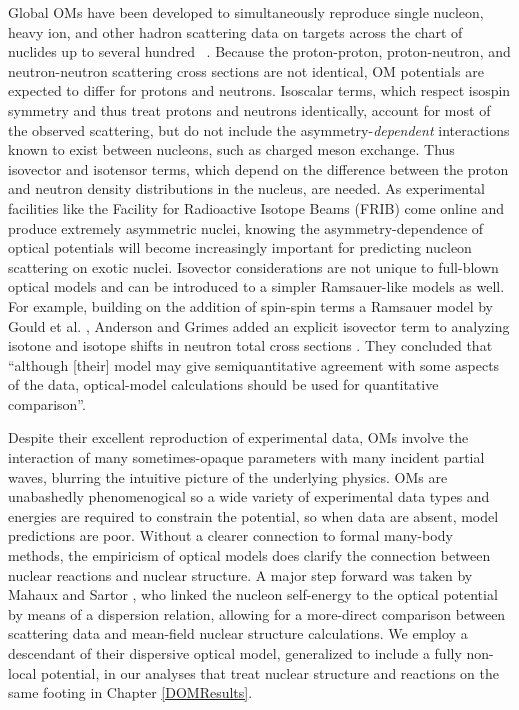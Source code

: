 Global OMs have been developed to simultaneously reproduce single nucleon, heavy ion,
and other hadron scattering data on targets across the chart of nuclides up to several
hundred \mega\electronvolt\ \cite{CH89, KoningDelaroche}. Because the proton-proton,
proton-neutron, and neutron-neutron scattering cross sections
are not identical, OM potentials are expected to differ for protons and
neutrons. Isoscalar terms, which respect isospin symmetry and thus treat protons and neutrons 
identically, account for most of the observed scattering, but do not include
the asymmetry-\textit{dependent} interactions known to exist between
nucleons, such as charged meson exchange.
Thus isovector and isotensor terms,
which depend on the difference between the proton and neutron density
distributions in the nucleus, are needed. As experimental facilities like
the Facility for Radioactive Isotope Beams (FRIB) come online and produce
extremely asymmetric nuclei, knowing the asymmetry-dependence of optical
potentials will become increasingly important for predicting nucleon scattering on
exotic nuclei. Isovector considerations are not unique to full-blown optical
models and can be introduced to a simpler Ramsauer-like models as well. For example, building
on the addition of spin-spin terms a Ramsauer model by Gould et al. \cite{Gould1986},
Anderson and Grimes added an explicit isovector term to analyzing isotone and isotope shifts in 
neutron total cross sections \cite{Anderson1990}.
They concluded that ``although [their] model may give
semiquantitative agreement with some aspects of the data, optical-model
calculations should be used for quantitative comparison''.

Despite their excellent reproduction of experimental data,
OMs involve the interaction of
many sometimes-opaque parameters with many incident
partial waves, blurring the intuitive picture of the underlying physics.
OMs are unabashedly phenomenogical so a wide variety of
experimental data types and energies are required to constrain the potential,
so when data are absent, model predictions are poor. Without a clearer connection to formal
many-body methods, the empiricism of optical models does clarify the connection between nuclear
reactions and nuclear structure. A major step forward was taken by Mahaux and Sartor
\cite{Mahaux1991}, who linked the nucleon self-energy to the optical potential by means of a
dispersion relation, allowing for a more-direct comparison between scattering data and mean-field nuclear
structure calculations. We employ a descendant of their dispersive optical model, generalized to include a
fully non-local potential, in our analyses that treat nuclear structure and reactions on the same
footing in Chapter \ref{DOMResults}.

